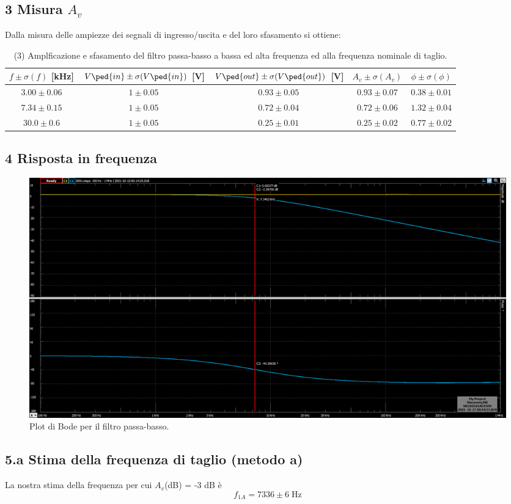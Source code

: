 \documentclass[10pt,a4paper]{article}
\begin{document}
\subsection*{3 Misura $A_v$}
Dalla misura delle ampiezze dei segnali di ingresso/uscita e del loro 
sfasamento si ottiene:
\begin{table}[h]
\centering
\begin{tabular}{|c|c|c|c|c|}
\hline 
$f \pm \sigma(f)$ [kHz] & $V\ped{in} \pm \sigma(V\ped{in})$ [V] 
                        & $V\ped{out} \pm \sigma(V\ped{out})$ [V] & $A_v \pm 
\sigma(A_v)$
& $\phi \pm \sigma(\phi)$ \\
\hline 
$3.00 \pm 0.06$ & $1 \pm 0.05$ & $0.93 \pm 0.05$ & $0.93 \pm 0.07$ & $0.38 \pm 
0.01$ \\
$7.34 \pm 0.15$ & $1 \pm 0.05$ & $0.72 \pm 0.04$ & $0.72 \pm 0.06$ & $1.32 \pm 
0.04$ \\
$30.0 \pm 0.6$ & $1 \pm 0.05$ & $0.25 \pm 0.01$ & $0.25 \pm 0.02$ & $0.77 \pm 
0.02$ \\
\hline 
\end{tabular} 
\caption{(3) Amplficazione e sfasamento del filtro passa-basso a bassa ed alta 
frequenza ed alla frequenza nominale di taglio.
\label{tab: lpfmes}}
\end{table}

\subsection*{4 Risposta in frequenza}
\begin{figure}[htbp]
\centering
\includegraphics[scale=0.35]{rc2k10nF_new}
\caption{Plot di Bode per il filtro passa-basso.}
\end{figure}

\subsection*{5.a Stima della frequenza di taglio (metodo a)}
La nostra stima della frequenza per cui $A_v$(dB) = -3 dB \`e
\[
f_{1A} = 7336 \pm 6 \; \si{\Hz}
\]
\end{document}
